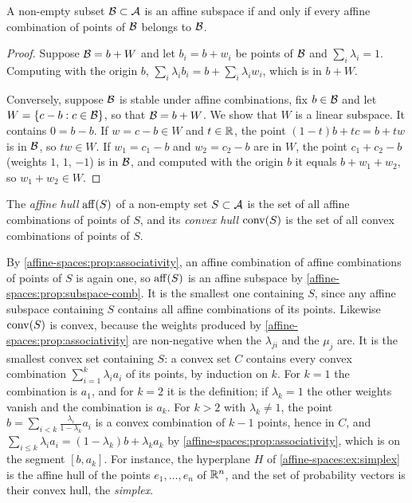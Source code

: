 \begin{notechapter}
\begin{proposition}
\label{affine-spaces:prop:subspace-comb}
A non-empty subset $\mathcal{B}\subset\mathcal{A}$ is an affine subspace if and only if
every affine combination of points of $\mathcal{B}$ belongs to $\mathcal{B}$.
\end{proposition}

\begin{proof}
Suppose $\mathcal{B} = b + W$ and let $b_i = b + w_i$ be points of $\mathcal{B}$ and
$\sum_i\lambda_i = 1$. Computing with the origin $b$,
$\sum_i\lambda_ib_i = b + \sum_i\lambda_iw_i$, which is in $b + W$.

Conversely, suppose $\mathcal{B}$ is stable under affine combinations, fix
$b\in\mathcal{B}$ and let $W = \{c - b : c\in\mathcal{B}\}$, so that $\mathcal{B} = b + W$. We
show that $W$ is a linear subspace. It contains $0 = b - b$. If
$w = c - b\in W$ and $t\in\mathbb{R}$, the point $(1 - t)b + tc = b + tw$ is in
$\mathcal{B}$, so $tw\in W$. If $w_1 = c_1 - b$ and $w_2 = c_2 - b$ are in $W$, the
point $c_1 + c_2 - b$ (weights $1$, $1$, $-1$) is in $\mathcal{B}$, and computed
with the origin $b$ it equals $b + w_1 + w_2$, so $w_1 + w_2\in W$.
\end{proof}

\begin{definition}
The \emph{affine hull} $\operatorname{aff}(S)$ of a non-empty set $S\subset\mathcal{A}$ is the
set of all affine combinations of points of $S$, and its \emph{convex hull}
$\operatorname{conv}(S)$ is the set of all convex combinations of points of $S$.
\end{definition}

By \cref{affine-spaces:prop:associativity}, an affine combination of
affine combinations of points of $S$ is again one, so $\operatorname{aff}(S)$ is an
affine subspace by \cref{affine-spaces:prop:subspace-comb}. It is the
smallest one containing $S$, since any affine subspace containing $S$
contains all affine combinations of its points. Likewise $\operatorname{conv}(S)$ is
convex, because the weights produced by
\cref{affine-spaces:prop:associativity} are non-negative when the
$\lambda_{ji}$ and the $\mu_j$ are. It is the smallest convex set containing
$S$: a convex set $C$ contains every convex combination
$\sum_{i=1}^k\lambda_ia_i$ of its points, by induction on $k$. For
$k = 1$ the combination is $a_1$, and for $k = 2$ it is the definition;
if $\lambda_k = 1$ the other weights vanish and the combination is
$a_k$. For $k > 2$ with $\lambda_k\neq1$, the point
$b = \sum_{i<k}\frac{\lambda_i}{1 - \lambda_k}a_i$ is a convex combination of
$k - 1$ points, hence in $C$, and
$\sum_{i\leq k}\lambda_ia_i = (1 - \lambda_k)b + \lambda_ka_k$ by
\cref{affine-spaces:prop:associativity}, which is on the segment
$[b, a_k]$. For instance, the hyperplane $H$ of
\cref{affine-spaces:ex:simplex} is the affine hull of the points
$e_1,\dots,e_n$ of $\mathbb{R}^n$, and the set of probability vectors is their
convex hull, the \emph{simplex}.


\end{notechapter}
